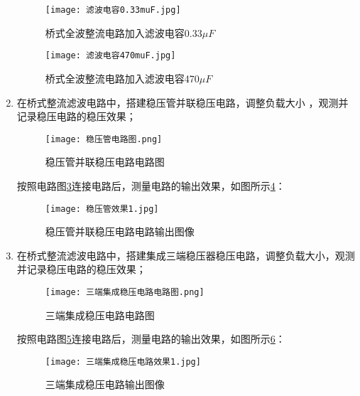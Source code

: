 \documentclass[dvipsnames, svgnames,a4paper,11pt]{article}
\begin{document}
\begin{enumerate}
				\begin{figure}[htbp]
					\centering
					\texttt{[image: 滤波电容0.33muF.jpg]}
					\caption{桥式全波整流电路加入滤波电容0.33$\mu F$}
					\label{fig:全波整流+滤波电容1}
				\end{figure}


				\begin{figure}[htbp]
					\centering
					\texttt{[image: 滤波电容470muF.jpg]}
					\caption{桥式全波整流电路加入滤波电容470$\mu F$}
					\label{fig:全波整流+滤波电容2}
				\end{figure}








			\item 在桥式整流滤波电路中，搭建稳压管并联稳压电路，调整负载大小 ，观测并记录稳压电路的稳压效果；
			

				\begin{figure}[htbp]
					\centering
					\texttt{[image: 稳压管电路图.png]}
					\caption{稳压管并联稳压电路电路图}
					\label{fig:稳压管电路图}
				\end{figure}

				按照电路图\cref{fig:稳压管电路图}连接电路后，测量电路的输出效果，如图所示\cref{fig:稳压管效果1}：



				\begin{figure}[htbp]
					\centering
					\texttt{[image: 稳压管效果1.jpg]}
					\caption{稳压管并联稳压电路电路输出图像}
					\label{fig:稳压管效果1}
				\end{figure}



			\item 在桥式整流滤波电路中，搭建集成三端稳压器稳压电路，调整负载大小，观测并记录稳压电路的稳压效果；
			

				\begin{figure}[htbp]
					\centering
					\texttt{[image: 三端集成稳压电路电路图.png]}
					\caption{三端集成稳压电路电路图}
					\label{fig:三端集成稳压电路电路图}
				\end{figure}

				按照电路图\cref{fig:三端集成稳压电路电路图}连接电路后，测量电路的输出效果，如图所示\cref{fig:三端集成稳压电路效果1}：

				\begin{figure}[htbp]
					\centering
					\texttt{[image: 三端集成稳压电路效果1.jpg]}
					\caption{三端集成稳压电路输出图像}
					\label{fig:三端集成稳压电路效果1}
				\end{figure}












\end{enumerate}
\end{document}
